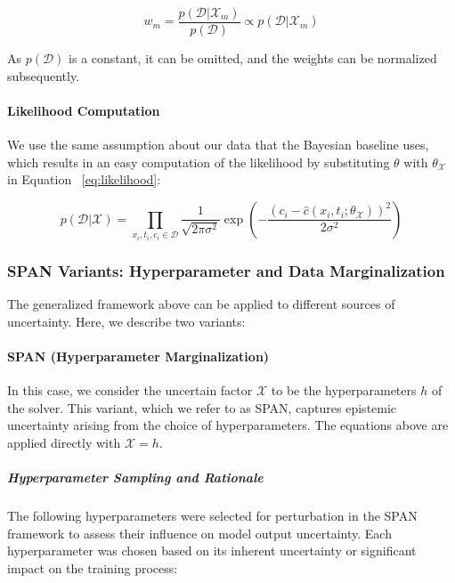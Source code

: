 \begin{equation*}
w_m = \frac{p(\mathcal{D} | \mathcal{X}_m)}{p(\mathcal{D})} \propto p(\mathcal{D} | \mathcal{X}_m)
\end{equation*}

As $p(\mathcal{D})$ is a constant, it can be omitted, and the weights can be normalized subsequently.


\paragraph{Likelihood Computation}

We use the same assumption about our data that the Bayesian baseline uses, which results in an easy computation of the likelihood by substituting $\theta$ with $\theta_{\mathcal{X}}$ in Equation ~\vref{eq:likelihood}:

\begin{equation*}
p(\mathcal{D} | \mathcal{X}) = \prod_{x_i, t_i, c_i \in \mathcal{D}} \frac{1}{\sqrt{2\pi \sigma^2}} \exp \left( -\frac{(c_i - \hat{c}(x_i, t_i; \theta_{\mathcal{X}}))^2}{2\sigma^2} \right)
\end{equation*}

\subsubsection{SPAN Variants: Hyperparameter and Data Marginalization}

The generalized framework above can be applied to different sources of uncertainty. Here, we describe two variants:

\paragraph{SPAN (Hyperparameter Marginalization)}

In this case, we consider the uncertain factor $\mathcal{X}$ to be the hyperparameters $h$ of the solver. This variant, which we refer to as SPAN, captures epistemic uncertainty arising from the choice of hyperparameters. The equations above are applied directly with $\mathcal{X} = h$.

\subparagraph{Hyperparameter Sampling and Rationale}
The following hyperparameters were selected for perturbation in the SPAN framework to assess their influence on model output uncertainty. Each hyperparameter was chosen based on its inherent uncertainty or significant impact on the training process:


